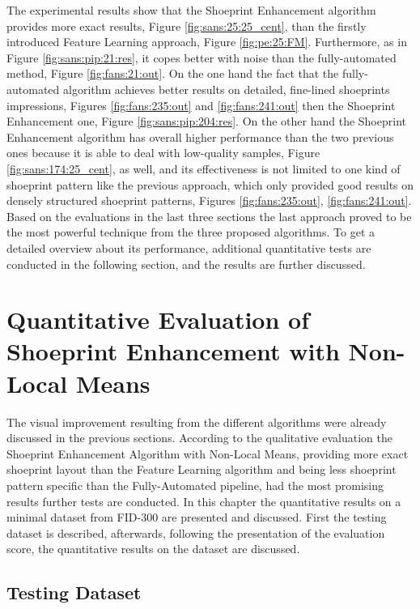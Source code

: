 \documentclass[draft,final]{vutinfth} %
\begin{document}
\par
The experimental results show that the Shoeprint Enhancement algorithm provides more exact results, Figure \ref{fig:sans:25:25_cent}, than the firstly introduced Feature Learning approach, Figure \ref{fig:pe:25:FM}.
Furthermore, as in Figure \ref{fig:sans:pip:21:res}, it copes better with noise than the fully-automated method, Figure \ref{fig:fans:21:out}.
On the one hand the fact that the fully-automated algorithm achieves better results on detailed, fine-lined shoeprints impressions, Figures \ref{fig:fans:235:out} and \ref{fig:fans:241:out} then the Shoeprint Enhancement one, Figure \ref{fig:sans:pip:204:res}.
On the other hand the Shoeprint Enhancement algorithm has overall higher performance than the two previous ones because it is able to deal with low-quality samples, Figure \ref{fig:sans:174:25_cent}, as well, and its effectiveness is not limited to one kind of shoeprint pattern like the previous approach, which only provided good results on densely structured shoeprint patterns, Figures \ref{fig:fans:235:out}, \ref{fig:fans:241:out}. 
Based on the evaluations in the last three sections the last approach proved to be the most powerful technique from the three proposed algorithms.
To get a detailed overview about its performance, additional quantitative tests are conducted in the following section, and the results are further discussed.

\section{Quantitative Evaluation of Shoeprint Enhancement with Non-Local Means}
\par
The visual improvement resulting from the different algorithms were already discussed in the previous sections.
According to the qualitative evaluation the Shoeprint Enhancement Algorithm with Non-Local Means, providing more exact shoeprint layout than the Feature Learning algorithm and being less shoeprint pattern specific than the Fully-Automated pipeline, had the most promising results further tests are conducted.
In this chapter the quantitative results on a minimal dataset from FID-300 are presented and discussed.
First the testing dataset is described, afterwards, following the presentation of the evaluation score, the quantitative results on the dataset are discussed.

\subsection{Testing Dataset}
\end{document}
